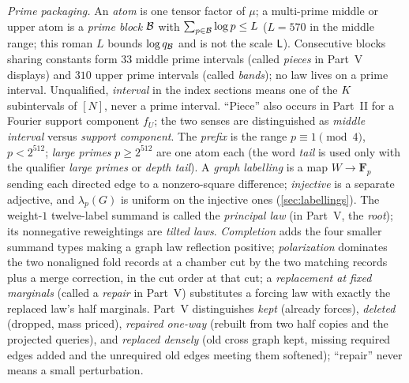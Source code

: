 \emph{Prime packaging.}
An \emph{atom} is one tensor factor of $\mu$; a multi-prime
middle or upper atom is a \emph{prime block} $\mathcal B$ with
$\sum_{p\in\mathcal B}\log p\le L$ ($L=570$ in the middle range; this
roman $L$ bounds $\log q_{\mathcal B}$ and is not the scale $\mathsf L$).
Consecutive blocks sharing constants form $33$ middle prime
intervals (called \emph{pieces} in Part~V displays) and $310$ upper
prime intervals (called \emph{bands}); no law lives on a prime
interval. Unqualified, \emph{interval} in the index sections means
one of the $K$ subintervals of $[N]$, never a prime interval. ``Piece'' also occurs in Part~II for a Fourier support
component $f_U$; the two senses are distinguished as
\emph{middle interval} versus \emph{support component}. The
\emph{prefix} is the range $p\equiv1\pmod4$, $p<2^{512}$; \emph{large
primes} $p\ge2^{512}$ are one atom each (the word \emph{tail} is used
only with the qualifier \emph{large primes} or \emph{depth tail}).
A \emph{graph labelling} is a map $W\to\mathbf F_p$ sending each
directed edge to a nonzero-square difference; \emph{injective} is a
separate adjective, and $\lambda_p(G)$ is uniform on the injective
ones (\cref{sec:labellings}). The weight-$1$ twelve-label summand is
called the \emph{principal law} (in Part~V, the \emph{root}); its
nonnegative reweightings are \emph{tilted laws}. \emph{Completion}
adds the four smaller summand types making a graph law reflection
positive; \emph{polarization} dominates the two
nonaligned fold records at a chamber cut by the two matching
records plus a merge correction, in the cut order at that cut;
a \emph{replacement at fixed marginals} (called a \emph{repair} in
Part~V) substitutes a forcing law with exactly the replaced law's
half marginals. Part~V distinguishes \emph{kept} (already forces),
\emph{deleted} (dropped, mass priced), \emph{repaired one-way}
(rebuilt from two half copies and the projected queries), and
\emph{replaced densely} (old cross graph kept, missing required
edges added and the unrequired old edges meeting them softened); ``repair'' never means a small perturbation.

